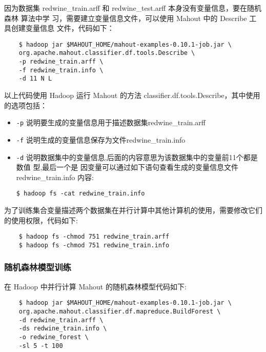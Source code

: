 因为数据集 redwine\_train.arff 和 redwine\_test.arff
本身没有变量信息，要在随机森林 算法中学 习，需要建立变量信息文件，可以使用
Mahout 中的 Describe 工具创建变量信息 文件，代码如下：

\begin{lstlisting}
	$ hadoop jar $MAHOUT_HOME/mahout-examples-0.10.1-job.jar \ 
	org.apache.mahout.classifier.df.tools.Describe \
	-p redwine_train.arff \
	-f redwine_train.info \
	-d 11 N L
\end{lstlisting}

以上代码使用 Hadoop 运行 Mahout 的方法
classifier.df.tools.Describe，其中使用的选项包括：

\begin{itemize}
\item
  \lstinline!-p!  说明要生成的变量信息用于描述数据集redwine\_train.arff
\item
  \lstinline!-f! 说明生成的变量信息保存为文件redwine\_train.info
\item
  \lstinline!-d! 说明数据集中的变量信息,后面的内容意思为该数据集中的变量前11个都是数值
  型,最后一个是 因变量可以通过如下语句查看生成的变量信息文件
  redwine\_train.info 内容:

\begin{lstlisting}
$ hadoop fs -cat redwine_train.info
\end{lstlisting}
\end{itemize}

为了训练集合变量描述两个数据集在并行计算中其他计算机的使用，需要修改它们的使用权限，代码如下:

\begin{lstlisting}
	$ hadoop fs -chmod 751 redwine_train.arff
	$ hadoop fs -chmod 751 redwine_train.info
\end{lstlisting}

\subsubsection{随机森林模型训练}\label{ux968fux673aux68eeux6797ux6a21ux578bux8badux7ec3}

在 Hadoop 中并行计算 Mahout 的随机森林模型代码如下:

\begin{lstlisting}
	$ hadoop jar $MAHOUT_HOME/mahout-examples-0.10.1-job.jar \
	org.apache.mahout.classifier.df.mapreduce.BuildForest \
	-d redwine_train.arff \
	-ds redwine_train.info \
	-o redwine_forest \
	-sl 5 -t 100
\end{lstlisting}

